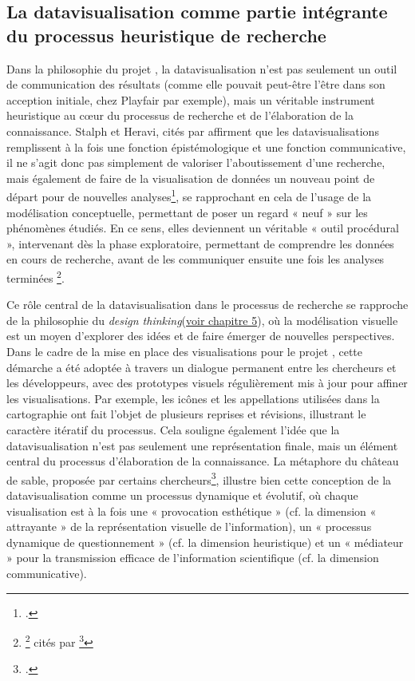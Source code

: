 \subsection{La datavisualisation comme partie intégrante du processus heuristique de recherche}


Dans la philosophie du projet \pense, la datavisualisation n’est pas seulement un outil de communication des résultats (comme elle pouvait peut-être l’être dans son acception initiale, chez Playfair par exemple), mais un véritable instrument heuristique au cœur du processus de recherche et de l’élaboration de la connaissance. Stalph et Heravi, cités par \citeauthor{sanders_developing_nodate} affirment que les datavisualisations remplissent à la fois une fonction épistémologique et une fonction communicative, il ne s’agit donc pas simplement de valoriser l’aboutissement d’une recherche, mais également de faire de la visualisation de données un nouveau point de départ pour de nouvelles analyses\footcite[p.6]{sanders_developing_nodate}, se rapprochant en cela de l’usage de la modélisation conceptuelle, permettant de poser un regard « neuf » sur les phénomènes étudiés. 
En ce sens, elles deviennent un véritable « outil procédural », intervenant dès la phase exploratoire, permettant de comprendre les données en cours de recherche, avant de les communiquer ensuite une fois les analyses terminées \footnote{\footcite[p.1645]{stalph_exploring_2021} cités par \footcite[p.6]{sanders_developing_nodate}}.     

Ce rôle central de la datavisualisation dans le processus de recherche se rapproche de la philosophie du \textit{design thinking}(\hyperlink{chap5}{voir chapitre 5}), où la modélisation visuelle est un moyen d’explorer des idées et de faire émerger de nouvelles perspectives. Dans le cadre de la mise en place des visualisations pour le projet \pense, cette démarche a été adoptée à travers un dialogue permanent entre les chercheurs et les développeurs, avec des prototypes visuels régulièrement mis à jour pour affiner les visualisations. Par exemple, les icônes et les appellations utilisées dans la cartographie ont fait l’objet de plusieurs reprises et révisions, illustrant le caractère itératif du processus. Cela souligne également l’idée que la datavisualisation n’est pas seulement une représentation finale, mais un élément central du processus d’élaboration de la connaissance.
La métaphore du château de sable, proposée par certains chercheurs\footcite{hinrichs_defense_2019}, illustre bien cette conception de la datavisualisation comme un processus dynamique et évolutif, où chaque visualisation est à la fois une « provocation esthétique » (cf. la dimension « attrayante » de la représentation visuelle de l’information), un « processus dynamique de questionnement » (cf. la dimension heuristique) et un « médiateur » pour la transmission efficace de l’information scientifique (cf. la dimension communicative). 